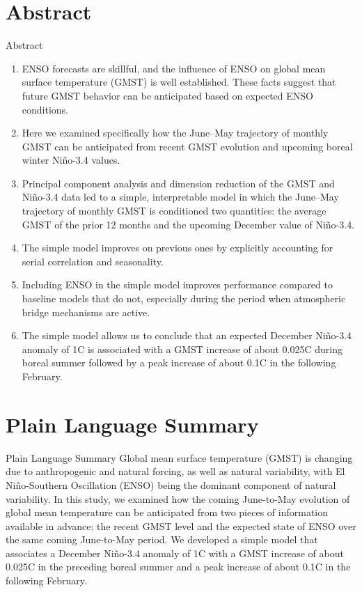 \documentclass[aspectratio=169,xcolor=dvipsnames]{beamer}
\begin{document}
\section*{Abstract}
\begin{frame}{Abstract}
\begin{enumerate}\scriptsize
\item ENSO forecasts are skillful, and the influence of ENSO on global
  mean surface temperature (GMST) is well established. These facts
  suggest that future GMST behavior can be anticipated based on
  expected ENSO conditions.

\item Here we examined specifically how the June--May trajectory of
  monthly GMST can be anticipated from recent GMST evolution and
  upcoming boreal winter Ni\~no-3.4 values.

\item Principal component analysis and dimension reduction of the GMST
  and Ni\~no-3.4 data led to a simple, interpretable model in which
  the June--May trajectory of monthly GMST is conditioned two
  quantities: the average GMST of the prior 12 months and the upcoming
  December value of Ni\~no-3.4.

\item The simple model improves on previous ones by explicitly
  accounting for serial correlation and seasonality.
  
\item Including ENSO in the simple model improves performance compared
  to baseline models that do not, especially during the period when
  atmospheric bridge mechanisms are active.

\item The simple model allows us to conclude that an expected December
  Ni\~no-3.4 anomaly of 1\textdegree C is associated with a GMST
  increase of about 0.025\textdegree C during boreal summer followed
  by a peak increase of about 0.1\textdegree C in the following
  February.
  
\end{enumerate}
\end{frame}

\section*{Plain Language Summary}
\begin{frame}{Plain Language Summary}
  Global mean surface temperature (GMST) is changing due to
  anthropogenic and natural forcing, as well as natural variability,
  with El Ni\~no-Southern Oscillation (ENSO) being the dominant
  component of natural variability. In this study, we examined how the
  coming June-to-May evolution of global mean temperature can be
  anticipated from two pieces of information available in advance: the
  recent GMST level and the expected state of ENSO over the same
  coming June-to-May period. We developed a simple model that
  associates a December Ni\~no-3.4 anomaly of 1\textdegree C with a
  GMST increase of about 0.025\textdegree C in the preceding boreal
  summer and a peak increase of about 0.1\textdegree C in the
  following February.
\end{frame}
\end{document}
